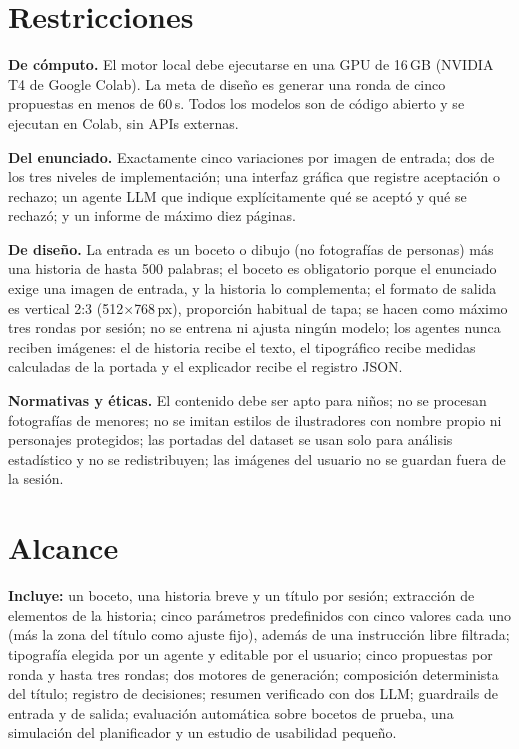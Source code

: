\documentclass[10pt,a4paper,twocolumn]{article}
\begin{document}
\section{Restricciones}
\textbf{De cómputo.} El motor local debe ejecutarse en una GPU de 16\,GB (NVIDIA T4 de Google Colab). La meta de diseño es generar una ronda de cinco propuestas en menos de 60\,s. Todos los modelos son de código abierto y se ejecutan en Colab, sin APIs externas.

\textbf{Del enunciado.} Exactamente cinco variaciones por imagen de entrada; dos de los tres niveles de implementación; una interfaz gráfica que registre aceptación o rechazo; un agente LLM que indique explícitamente qué se aceptó y qué se rechazó; y un informe de máximo diez páginas.

\textbf{De diseño.} La entrada es un boceto o dibujo (no fotografías de personas) más una historia de hasta 500 palabras; el boceto es obligatorio porque el enunciado exige una imagen de entrada, y la historia lo complementa; el formato de salida es vertical 2:3 (512$\times$768\,px), proporción habitual de tapa; se hacen como máximo tres rondas por sesión; no se entrena ni ajusta ningún modelo; los agentes nunca reciben imágenes: el de historia recibe el texto, el tipográfico recibe medidas calculadas de la portada y el explicador recibe el registro JSON.

\textbf{Normativas y éticas.} El contenido debe ser apto para niños; no se procesan fotografías de menores; no se imitan estilos de ilustradores con nombre propio ni personajes protegidos; las portadas del dataset se usan solo para análisis estadístico y no se redistribuyen; las imágenes del usuario no se guardan fuera de la sesión.

\section{Alcance}
\textbf{Incluye:} un boceto, una historia breve y un título por sesión; extracción de elementos de la historia; cinco parámetros predefinidos con cinco valores cada uno (más la zona del título como ajuste fijo), además de una instrucción libre filtrada; tipografía elegida por un agente y editable por el usuario; cinco propuestas por ronda y hasta tres rondas; dos motores de generación; composición determinista del título; registro de decisiones; resumen verificado con dos LLM; guardrails de entrada y de salida; evaluación automática sobre bocetos de prueba, una simulación del planificador y un estudio de usabilidad pequeño.
\end{document}
